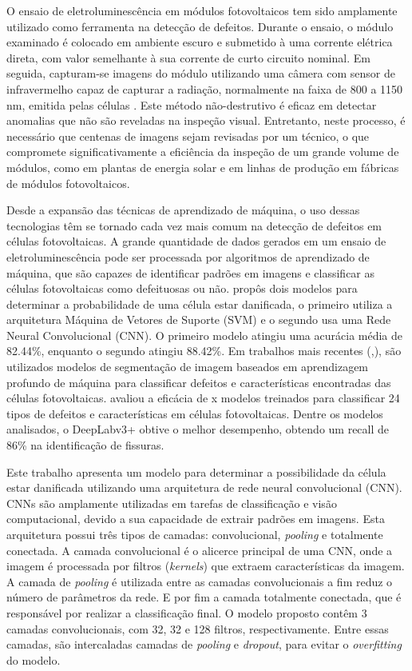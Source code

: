 \documentclass[conference]{IEEEtran}
\begin{document}
O ensaio de eletroluminescência em módulos fotovoltaicos tem sido amplamente
utilizado como ferramenta na detecção de
defeitos. Durante o ensaio, o módulo examinado é colocado em ambiente escuro e
submetido à uma corrente elétrica direta, com valor semelhante à sua corrente
de curto circuito nominal.  Em seguida, capturam-se imagens do módulo
utilizando uma câmera com sensor de infravermelho capaz de capturar a radiação,
normalmente na faixa de 800 a 1150 nm, emitida pelas células
\cite{Frazao20177}. Este método não-destrutivo é eficaz em detectar anomalias
que não são reveladas na inspeção visual. Entretanto, neste processo,
é necessário que centenas de imagens sejam revisadas por um técnico, o que
compromete significativamente a eficiência da inspeção de um grande volume de
módulos, como em plantas de energia solar e em linhas de produção em fábricas
de módulos fotovoltaicos.

Desde a expansão das técnicas de aprendizado de máquina, o uso dessas
tecnologias têm se tornado cada vez mais comum na detecção de defeitos em
células fotovoltaicas. A grande quantidade de dados gerados em um ensaio de
eletroluminescência pode ser processada por algoritmos de aprendizado de
máquina, que são capazes de identificar padrões em imagens e classificar as
células fotovoltaicas como defeituosas ou não. \cite{Pratt2023} propôs
dois modelos
para determinar a probabilidade de uma célula estar danificada, o primeiro
utiliza a arquitetura
Máquina de Vetores de Suporte (SVM) e o segundo usa uma Rede Neural
Convolucional (CNN). O primeiro modelo atingiu uma acurácia média de 82.44\%,
enquanto o segundo atingiu 88.42\%. Em trabalhos mais recentes
(\cite{Pratt2023},\cite{Pratt2021}), são
utilizados modelos de segmentação de imagem baseados em aprendizagem profundo
de máquina para classificar defeitos e características encontradas das células
fotovoltaicas.\cite{Pratt2023} avaliou a eficácia de x modelos treinados para
classificar
24 tipos de defeitos e características em células fotovoltaicas.
Dentre os modelos analisados, o DeepLabv3+ obtive o melhor
desempenho, obtendo um recall de 86\% na identificação de fissuras.

Este trabalho apresenta um modelo para determinar a
possibilidade da célula estar danificada utilizando uma arquitetura de rede
neural convolucional (CNN). CNNs são amplamente utilizadas em tarefas de
classificação e visão computacional, devido a sua capacidade de extrair padrões
em imagens. Esta arquitetura possui três tipos de camadas:
convolucional, \textit{pooling} e totalmente conectada. A camada convolucional
é o alicerce principal de uma CNN, onde a imagem é processada por filtros
(\textit{kernels}) que
extraem características da imagem. A camada de \textit{pooling} é utilizada
entre as camadas convolucionais a fim reduz o número de parâmetros da rede. E
por fim a camada totalmente conectada, que é responsável por realizar a
classificação final. O modelo proposto contêm 3 camadas convolucionais, com 32,
32 e 128 filtros, respectivamente. Entre essas camadas, são intercaladas
camadas de
\textit{pooling} e \textit{dropout}, para evitar o \textit{overfitting} do
modelo.
\end{document}
